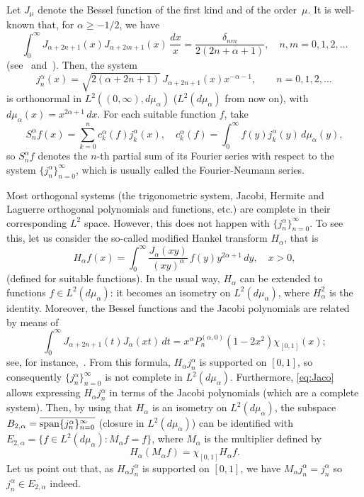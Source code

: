 \documentclass[10pt,a4paper]{article}
\newcommand{\htr}{H_{\alpha}} %
\newcommand{\ma}{M_{\alpha}}
\newcommand{\mua}{d\mu_\alpha}
\newcommand{\jna}{j_n^{\alpha}}
\newcommand{\jka}{j_k^{\alpha}}
\newcommand{\cka}{c_k^{\alpha}}
\newcommand{\Sna}{S_n^{\alpha}}
\newcommand{\spa}{\operatornamewithlimits{span}} %
\theoremstyle{plain}
\begin{document}
Let $J_\mu$ denote the Bessel function of the first kind and of the order~$\mu$.
It is well-known that, for $\alpha \ge -1/2$, we have 
\begin{equation*}
   \int_0^\infty J_{\alpha+2n+1}(x) J_{\alpha+2m+1}(x) \, \frac{dx}{x}
   = \frac{\delta_{nm}}{2(2n+\alpha+1)},
   \quad n, m = 0,1,2, \dots
\end{equation*}
(see~\cite[Ch.~XIII, 13.41 (7), p.~404]{Wat} and~\cite[Ch.~XIII, 13.42 (1), p.~405]{Wat}).
Then, the system
\begin{equation*}
  \jna(x) = \sqrt{2(\alpha+2n+1)}\,J_{\alpha+2n+1}(x) x^{-\alpha-1},
  \qquad n = 0,1,2,\dots\,
\end{equation*}
is orthonormal in $L^2((0,\infty),\mua)$ ($L^2(\mua)$ from now on), with $\mua(x) = x^{2\alpha+1}\,dx$.
For each suitable function $f$, take
\begin{equation*}
  \Sna f(x) = \sum_{k=0}^n \cka(f) \jka(x),
  \quad
  \cka(f) = \int_0^\infty f(y) \jka(y)\,\mua(y), 
\end{equation*}
so $\Sna f$ denotes the $n$-th partial sum of its Fourier series with respect to the system
$\{\jna\}_{n=0}^\infty$, which is usually called the Fourier-Neumann series.

Most orthogonal systems (the trigonometric system, Jacobi, Hermite and Laguerre orthogonal polynomials and functions, etc.\@) are complete in their corresponding $L^2$ space. However, this does not happen with $\{\jna\}_{n=0}^\infty$. To see this, let us consider the so-called modified Hankel transform $H_\alpha$, that is 
\begin{equation}
\label{eq:htr}
  \htr f(x) = \int_0^\infty \frac{J_\alpha(xy)}{(xy)^\alpha} \, f(y)
    y^{2\alpha+1} \, dy,
  \quad x>0,
\end{equation}
(defined for suitable functions).
In the usual way, $\htr$ can be extended to functions $f \in L^2(\mua)$: it becomes an isometry on $L^2(\mua)$, where $\htr^2$ is the identity. 
Moreover, the Bessel functions and the Jacobi polynomials are related by means of
\begin{equation}
\label{eq:Jaco}
   \int_0^\infty J_{\alpha +2n+1}(t) J_\alpha (xt)\,dt =
   x^\alpha P_n^{(\alpha,0)}(1-2x^2) \chi_{[0,1]}(x);
\end{equation}
see, for instance,~\cite[Ch.~8.11, (5), p.~47]{E-TIT}.
From this formula, $\htr \jna$ is supported on $[0,1]$, so consequently $\{\jna\}_{n=0}^\infty$ is not complete in $L^2(\mua)$. 
Furthermore, \eqref{eq:Jaco} allows expressing $\htr \jna$ in terms of the Jacobi polynomials (which are a complete system). Then, by using that $\htr$ is an isometry on $L^2(\mua)$, the subspace $B_{2,\alpha} = \overline{\spa\{\jna\}_{n=0}^\infty}$ (closure in $L^2(\mua)$)
can be identified with
$E_{2,\alpha} = \{ f \in L^2(\mua): \ma f = f \}$,
where $\ma$ is the multiplier defined by
$$
  \htr(\ma f) = \chi_{[0,1]}\htr f.
$$
Let us point out that, as $\htr \jna$ is supported on $[0,1]$, we have $\ma \jna = \jna$ so $\jna \in E_{2,\alpha}$ indeed.
\end{document}
